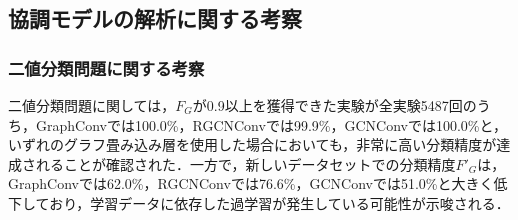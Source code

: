 \subsection{協調モデルの解析に関する考察}
%
%

\subsubsection*{二値分類問題に関する考察}
二値分類問題に関しては，$F_G$が0.9以上を獲得できた実験が全実験5487回のうち，GraphConvでは100.0\%，RGCNConvでは99.9\%，GCNConvでは100.0\%と，いずれのグラフ畳み込み層を使用した場合においても，非常に高い分類精度が達成されることが確認された．一方で，新しいデータセットでの分類精度$F'_G$は，GraphConvでは62.0\%，RGCNConvでは76.6\%，GCNConvでは51.0\%と大きく低下しており，学習データに依存した過学習が発生している可能性が示唆される．

